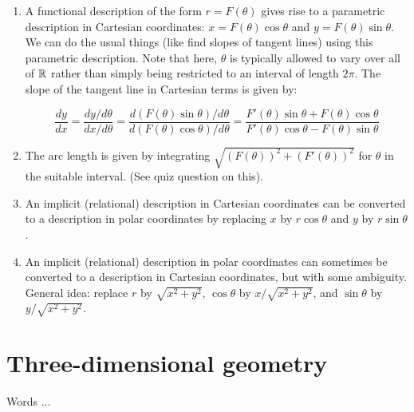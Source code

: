 \documentclass[10pt]{amsart}
\begin{document}
\begin{enumerate}
\item A functional description of the form $r = F(\theta)$ gives rise
  to a parametric description in Cartesian coordinates: $x =
  F(\theta)\cos \theta$ and $y = F(\theta)\sin \theta$. We can do the
  usual things (like find slopes of tangent lines) using this
  parametric description. Note that here, $\theta$ is typically
  allowed to vary over all of $\mathbb{R}$ rather than simply being restricted
  to an interval of length $2\pi$. The slope of the tangent line in
  Cartesian terms is given by:

$$\frac{dy}{dx} = \frac{dy/d\theta}{dx/d\theta} = \frac{d(F(\theta)\sin \theta)/d\theta}{d(F(\theta)\cos \theta)/d\theta} = \frac{F'(\theta)\sin \theta + F(\theta)\cos \theta}{F'(\theta) \cos \theta - F(\theta)\sin \theta}$$

\item The arc length is given by integrating $\sqrt{(F(\theta))^2 +
  (F'(\theta))^2}$ for $\theta$ in the suitable interval. (See quiz
  question on this).
\item An implicit (relational) description in Cartesian coordinates
  can be converted to a description in polar coordinates by replacing
  $x$ by $r\cos \theta$ and $y$ by $r\sin \theta$.
\item An implicit (relational) description in polar coordinates can
  sometimes be converted to a description in Cartesian coordinates,
  but with some ambiguity. General idea: replace $r$ by $\sqrt{x^2 +
  y^2}$, $\cos \theta$ by $x/\sqrt{x^2 + y^2}$, and $\sin \theta$ by
  $y/\sqrt{x^2 + y^2}$.
\end{enumerate}

\section{Three-dimensional geometry}

Words ...
\end{document}
